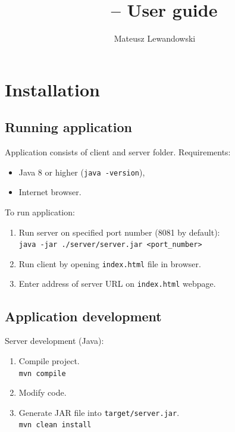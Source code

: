 \documentclass[12pt]{article}
\title{\appname \ \appversion \ -- User guide}
\author{Mateusz Lewandowski}
\begin{document}
\maketitle
\tableofcontents

\pagebreak

\section{Installation}

\subsection{Running application}\label{subsec:server}

Application consists of client and server folder. 
Requirements:
\begin{itemize}
    \setlength\itemsep{0em}
    \item Java 8 or higher (\texttt{java -version}),
    \item Internet browser. 
\end{itemize}

To run application:
\begin{enumerate}
    \setlength\itemsep{0em}
    \item Run server on specified port number (8081 by default):\\
          \texttt{java -jar ./server/server.jar <port\_number> }
    \item Run client by opening \texttt{index.html} file in browser.
    \item Enter address of server URL on \texttt{index.html} webpage.
\end{enumerate}

\subsection{Application development}

Server development (Java):
\begin{enumerate}
    \setlength\itemsep{0em}
    \item Compile project.\\
          \texttt{mvn compile}
    \item Modify code.
    \item Generate JAR file into \texttt{target/server.jar}.\\
          \texttt{mvn clean install}
\end{enumerate}
\end{document}
